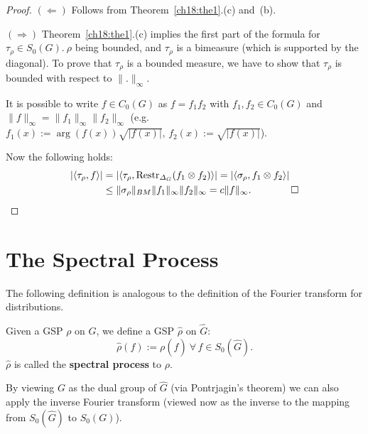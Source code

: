 \documentclass[graybox]{svmult}
\begin{document}
\begin{proof}
$(\Leftarrow )$ Follows from Theorem~\ref{ch18:the1}.(c) and~(b).

$(\Rightarrow )$  Theorem~\ref{ch18:the1}.(c)  implies the first part of the formula for $\tau_{\rho}\in {}{S_{0}(G)}. \: \rho $
being bounded, and $\tau_{\rho}$ is a bimeasure (which is supported by the diagonal).  To prove that $\tau_{\rho}$ is a bounded measure, we have to
show that $\tau_{\rho}$ is bounded with respect to $\| .\| _{\infty }$.

It is possible to write $f\in {}C_{0}(G)$ as $f =
f_{1}f_{2}$ with $f_{1},f_{2}\in {} C_{0}(G)$ and \\
%
$\| f\| _{\infty } = \| f_{1}\| _{\infty
}\| f_{2}\| _{\infty }$  (e.g.\ $f_{1}(x):= \arg
(f(x)) \sqrt{| f(x) |}, \,
f_{2}(x):=  \sqrt{| f(x) |}$).

\newpage  %
Now the following holds:
%
\begin{align*}
 | \langle\tau_{\rho},f\rangle| &=
 | \langle\tau_{\rho},{\operatorname{Restr}_{\varDelta_{G}}} (f_{1}\otimes f_{2})\rangle| =
 | \langle\sigma _{\rho},f_{1}\otimes f_{2}\rangle| \\&\le \|
\sigma _{\rho}\| _{BM}\| f_{1}\| _{\infty }\| f_{2}\| _{\infty }
= c\|f\| _{\infty }. \quad \quad  \qed 
\end{align*}
\end{proof}


\section{The Spectral Process}
\label{ch18:sec3}

The following definition is analogous to  the  definition  of  the
Fourier transform for distributions.

\begin{definition}\label{ch18:def7}
Given a GSP $\rho $ on $G$, we define a
GSP $\hat{\rho}$ on $\hat{G}$:
\[
\hat{\rho}(f) := \rho (\hat{f})  \
\forall \,  f \in S_{0}(\hat{G}).
\]
$\hat{\rho}$ is called the \textbf{spectral process} to $\rho $.
\end{definition}


By viewing $G$ as the dual group of $\hat{G}$ (via
Pontrjagin's theorem) we can also apply the inverse
Fourier transform (viewed now as the inverse to
the mapping from $S_{0}(\hat{G})$ to $S_{0}(G)$).
\end{document}
